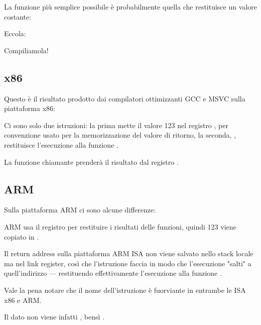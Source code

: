 
La funzione più semplice possibile è probabilmente quella che restituisce un valore costante:

Eccola:



Compiliamola!

\subsection{x86}

Questo è il risultato prodotto dai compilatori ottimizzanti GCC e MSVC sulla piattaforma x86:



Ci sono solo due istruzioni: la prima mette il valore 123 nel registro \EAX, per convenzione usato per la memorizzazione del valore di ritorno, la seconda, \RET, restituisce l'esecuzione alla funzione .

La funzione chiamante prenderà il risultato dal registro \EAX.

\subsection{ARM}

Sulla piattaforma ARM ci sono alcune differenze:



ARM usa il registro  per restituire i risultati delle funzioni, quindi 123 viene copiato in .

Il return address sulla piattaforma ARM \ac{ISA} non viene salvato nello stack locale ma nel link register, 
così che l'istruzione  faccia in modo che l'esecuzione "salti" a quell'indirizzo --- restituendo effettivamente l'esecuzione alla funzione .

Vale la pena notare che il nome dell'istruzione \MOV è fuorviante in entrambe le \ac{ISA} x86 e ARM. 

Il dato non viene infatti , bensì .

